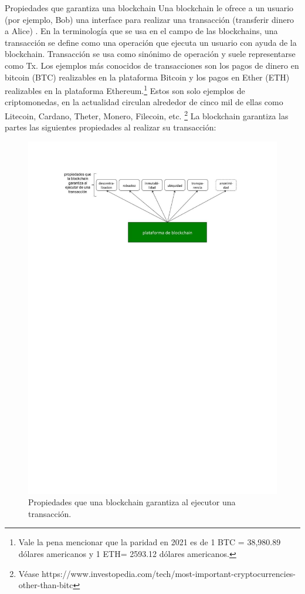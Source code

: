\documentclass[12pt]{report} %
\begin{document}
Propiedades que garantiza una blockchain
Una blockchain le ofrece a un usuario (por ejemplo, Bob) una interface para realizar una transacción (transferir dinero a Alice) .  
En la terminología que se usa en el campo de las blockchains, una transacción se define como una operación que ejecuta un usuario con ayuda de la blockchain. Transacción se usa como sinónimo de operación y suele representarse como Tx. Los ejemplos más conocidos de transacciones son los pagos de dinero en bitcoin (BTC) realizables en la plataforma Bitcoin y los pagos en Ether (ETH) realizables en la plataforma Ethereum.\footnote{  Vale la pena mencionar que la paridad en 2021 es de 1 BTC = 38,980.89 dólares americanos y 1 ETH= 2593.12 dólares americanos.}  
Estos son solo ejemplos de criptomonedas, en la actualidad circulan alrededor de cinco mil de ellas como Litecoin, Cardano, Theter, Monero, Filecoin, etc. \footnote{Véase https://www.investopedia.com/tech/most-important-cryptocurrencies-other-than-bitc} 
La blockchain garantiza las partes las siguientes propiedades al realizar su transacción:


\begin{figure}
\centering
\includegraphics[width=0.85\columnwidth]{bcimg.pdf}
\caption{Propiedades que una blockchain garantiza al ejecutor una transacción.}
\label{bcimg}
\end{figure} 
\end{document}
